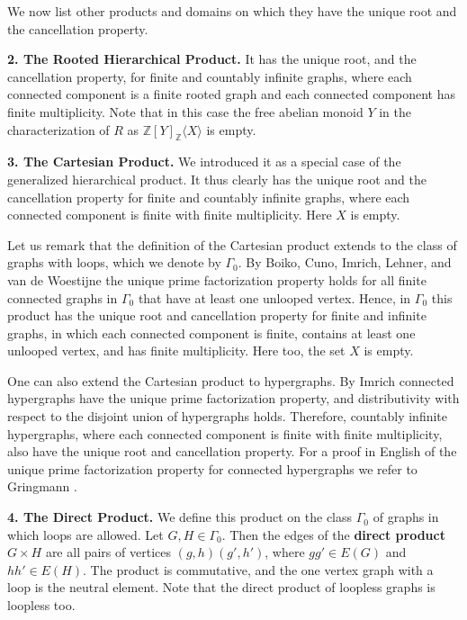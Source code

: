 \documentclass{amsart}
\theoremstyle{plain}
\theoremstyle{definition}
\newcommand{\defit}[1]{\textbf{#1}}
\newcommand{\bZ}{\mathbb Z}
\begin{document}
We now list other products and domains on which they have the unique root and the cancellation property.
\smallskip

\noindent \textbf{2. The Rooted Hierarchical Product.} It has the unique root, and the cancellation property, for finite and countably
infinite graphs, where each connected component is a finite rooted graph and each connected component has finite multiplicity. Note that in this case the free abelian monoid $Y$ in the characterization of $R$ as $\bZ[Y]_\bZ\langle X \rangle$  is empty.
\smallskip

\noindent \textbf{3. The Cartesian Product.} We introduced it as a special case of the
generalized hierarchical product. It thus clearly has
 the unique root and the cancellation property for finite and countably infinite graphs, where each connected component is finite with finite multiplicity. Here $X$ is empty.
\smallskip

Let us remark that the definition of the  Cartesian product extends to the class of graphs with loops, which we denote by $\Gamma_0$. By Boiko, Cuno,  Imrich, Lehner, and van de Woestijne
\cite{bocu2016} the unique prime factorization property holds for all finite connected graphs in $\Gamma_0$ that have at least one unlooped vertex. Hence, in $\Gamma_0$ this product has the unique root and cancellation property for finite and infinite graphs, in which each connected component is finite,  contains at least one unlooped vertex, and has finite multiplicity. Here too, the set $X$ is empty.
\smallskip

One can also extend the Cartesian product to hypergraphs. By Imrich \cite{im1967} connected hypergraphs have the unique prime factorization property, and distributivity with respect to the disjoint union of hypergraphs holds.  Therefore, countably infinite hypergraphs,  where each connected component is finite with finite multiplicity, also have  the unique root and cancellation property.  For a proof in English of the unique prime factorization property for connected hypergraphs we refer to Gringmann \cite{gring2010}.
\smallskip

\noindent
\textbf{4. The Direct Product.}  We  define this product on the class $\Gamma_0$ of graphs in which loops are allowed.
Let $G, H \in \Gamma_0$. Then the edges of the \defit{direct product} $G\times H$ are all pairs of vertices $(g,h)(g',h')$, where $gg'\in E(G)$ and $hh'\in E(H)$. The product is commutative,  and the one vertex graph with a loop is the neutral element. Note that the direct product of loopless graphs is loopless too.
\end{document}
